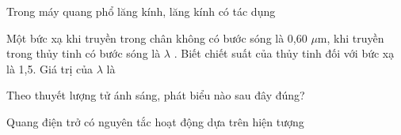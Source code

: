 \documentclass[11pt]{article}
\begin{document}
\begin{vnmultiplechoice}[ rearrange=yes, keycolumns=3]
\begin{question} %
Trong máy quang phổ lăng kính, lăng kính có tác dụng
\datcot[2]
\bonpa
{}
{}
{}
{}
\end{question}


\begin{question} %
Một bức xạ khi truyền trong chân không có bước sóng là 0,60 $\mu$m, khi truyền trong thủy
tinh có bước sóng là  $\lambda$ . Biết chiết suất của thủy tinh đối với bức xạ là 1,5. Giá trị của  $\lambda$ là
\datcot
\bonpa
{}
{}
{}
{}
\end{question}

\begin{question} %
Theo thuyết lượng tử ánh sáng, phát biểu nào sau đây đúng?
\datcot[4]
\bonpa
{}
{}
{}
{}
\end{question}

\begin{question} %
Quang điện trở có nguyên tắc hoạt động dựa trên hiện tượng
\datcot
\bonpa
{}
{}
{}
{}
\end{question}
\end{vnmultiplechoice}
\end{document}
